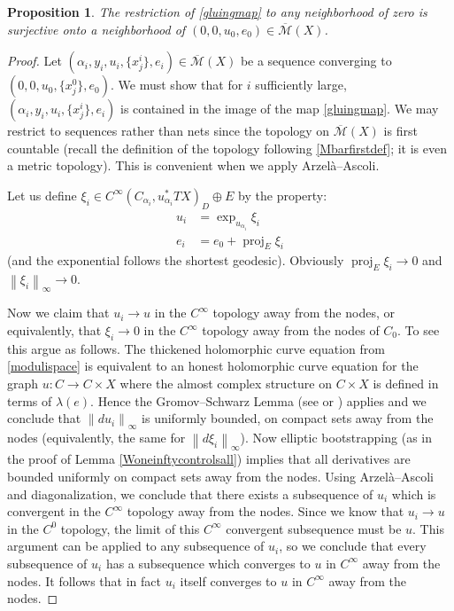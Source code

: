 \documentclass[12pt]{article}
\newtheorem{proposition}[theorem]{Proposition}
\theoremstyle{definition}
\theoremstyle{remark}
\numberwithin{equation}{subsection}
\newcommand{\proj}{\operatorname{proj}}
\newcommand{\Mbar}{\overline{\mathcal M}}
\begin{document}
\begin{proposition}\label{gluingsurjective}
The restriction of \eqref{gluingmap} to any neighborhood of zero is surjective onto a neighborhood of $(0,0,u_0,e_0)\in\Mbar(X)$.
\end{proposition}

\begin{proof}
Let $(\alpha_i,y_i,u_i,\{x^i_j\},e_i)\in\Mbar(X)$ be a sequence converging to $(0,0,u_0,\{x^0_j\},e_0)$.  We must show that for $i$ sufficiently large, $(\alpha_i,y_i,u_i,\{x^i_j\},e_i)$ is contained in the image of the map \eqref{gluingmap}.  We may restrict to sequences rather than nets since the topology on $\Mbar(X)$ is first countable (recall the definition of the topology following \eqref{Mbarfirstdef}; it is even a metric topology).  This is convenient when we apply Arzel\`a--Ascoli.

Let us define $\xi_i\in C^\infty(C_{\alpha_i},u_{\alpha_i}^\ast TX)_D\oplus E$ by the property:
\begin{align}
u_i&=\exp_{u_{\alpha_i}}\xi_i\\
e_i&=e_0+\proj_E\xi_i
\end{align}
(and the exponential follows the shortest geodesic).  Obviously $\proj_E\xi_i\to 0$ and $\left\|\xi_i\right\|_\infty\to 0$.

Now we claim that $u_i\to u$ in the $C^\infty$ topology away from the nodes, or equivalently, that $\xi_i\to 0$ in the $C^\infty$ topology away from the nodes of $C_0$.  To see this argue as follows.  The thickened holomorphic curve equation from \eqref{modulispace} is equivalent to an honest holomorphic curve equation for the graph $u:C\to C\times X$ where the almost complex structure on $C\times X$ is defined in terms of $\lambda(e)$.  Hence the Gromov--Schwarz Lemma (see \cite[p316, 1.3.A]{gromov} or \cite[p223, Corollary 4.1.4]{muller}) applies and we conclude that $\left\|du_i\right\|_\infty$ is uniformly bounded, on compact sets away from the nodes (equivalently, the same for $\left\|d\xi_i\right\|_\infty$).  Now elliptic bootstrapping (as in the proof of Lemma \ref{Woneinftycontrolsall}) implies that all derivatives are bounded uniformly on compact sets away from the nodes.  Using Arzel\`a--Ascoli and diagonalization, we conclude that there exists a subsequence of $u_i$ which is convergent in the $C^\infty$ topology away from the nodes.  Since we know that $u_i\to u$ in the $C^0$ topology, the limit of this $C^\infty$ convergent subsequence must be $u$.  This argument can be applied to any subsequence of $u_i$, so we conclude that every subsequence of $u_i$ has a subsequence which converges to $u$ in $C^\infty$ away from the nodes.  It follows that in fact $u_i$ itself converges to $u$ in $C^\infty$ away from the nodes.


\end{proof}
\end{document}
